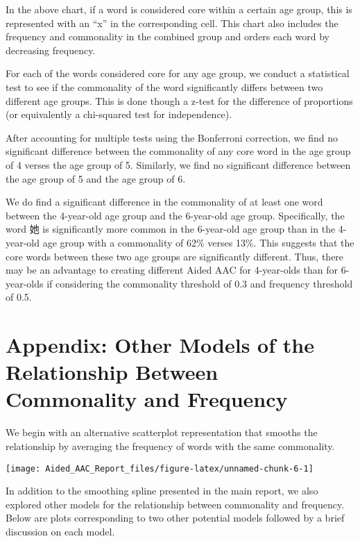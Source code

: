\documentclass[
]{article}
\begin{document}
In the above chart, if a word is considered core within a certain age
group, this is represented with an ``x'' in the corresponding cell. This
chart also includes the frequency and commonality in the combined group
and orders each word by decreasing frequency.

For each of the words considered core for any age group, we conduct a
statistical test to see if the commonality of the word significantly
differs between two different age groups. This is done though a z-test
for the difference of proportions (or equivalently a chi-squared test
for independence).

After accounting for multiple tests using the Bonferroni correction, we
find no significant difference between the commonality of any core word
in the age group of 4 verses the age group of 5. Similarly, we find no
significant difference between the age group of 5 and the age group of
6.

We do find a significant difference in the commonality of at least one
word between the 4-year-old age group and the 6-year-old age group.
Specifically, the word 她 is significantly more common in the 6-year-old
age group than in the 4-year-old age group with a commonality of 62\%
verses 13\%. This suggests that the core words between these two age
groups are significantly different. Thus, there may be an advantage to
creating different Aided AAC for 4-year-olds than for 6-year-olds if
considering the commonality threshold of 0.3 and frequency threshold of
0.5.

\hypertarget{appendix-other-models-of-the-relationship-between-commonality-and-frequency}{%
\section{Appendix: Other Models of the Relationship Between Commonality
and
Frequency}\label{appendix-other-models-of-the-relationship-between-commonality-and-frequency}}

We begin with an alternative scatterplot representation that smooths the
relationship by averaging the frequency of words with the same
commonality.

\begin{center}\texttt{[image: Aided\_AAC\_Report\_files/figure-latex/unnamed-chunk-6-1]} \end{center}

In addition to the smoothing spline presented in the main report, we
also explored other models for the relationship between commonality and
frequency. Below are plots corresponding to two other potential models
followed by a brief discussion on each model.
\end{document}

